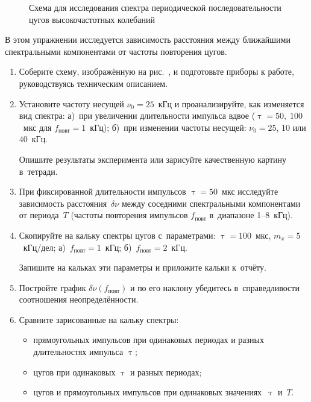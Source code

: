\begin{figure}[h!]
	\centering
	\caption{Схема для исследования спектра периодической последовательности цугов высокочастотных колебаний}
\end{figure}

\begin{lab:task}

В этом упражнении исследуется зависимость расстояния между ближайшими спектральными компонентами от частоты повторения цугов.

\begin{enumerate}
	\item Соберите схему, изображённую на рис.~, и подготовьте приборы к работе, руководствуясь техническим описанием.
	\item Установите частоту несущей $\nu_0=25$~кГц и проанализируйте, как изменяется вид спектра: а)~при увеличении длительности импульса вдвое ($\uptau=50,\;100$~мкс для $f_\text{повт}=1$~кГц); б)~при изменении частоты несущей: $\nu_0=25$, 10 или 40~кГц.
	
	Опишите результаты эксперимента или зарисуйте качественную картину в~тетради.
	\item При фиксированной длительности импульсов $\uptau=50$~мкс исследуйте зависимость расстояния~$\delta \nu$ между соседними спектральными компонентами от периода~$T$ (частоты повторения импульсов $f_\text{повт}$ в~диапазоне 1--8~кГц).
	\item Скопируйте на кальку спектры цугов с~параметрами: $\uptau=100$~мкс, $m_x=5$~кГц/дел; а)~$f_\text{повт}=1$~кГц; б)~$f_\text{повт}=2$~кГц.
	
	Запишите на кальках эти параметры и приложите кальки к~отчёту.
	
	\item Постройте график $\delta \nu(f_\text{повт})$ и по его наклону убедитесь в~справедливости соотношения неопределённости.
	\item Сравните зарисованные на кальку спектры:
	\begin{itemize}
		\item прямоугольных импульсов при одинаковых периодах и разных длительностях импульса $\uptau$;
		\item цугов при одинаковых $\uptau$ и разных периодах;
		\item цугов и прямоугольных импульсов при одинаковых значениях~$\uptau$ и~$T$.
	\end{itemize}
	
\end{enumerate}

\end{lab:task}

